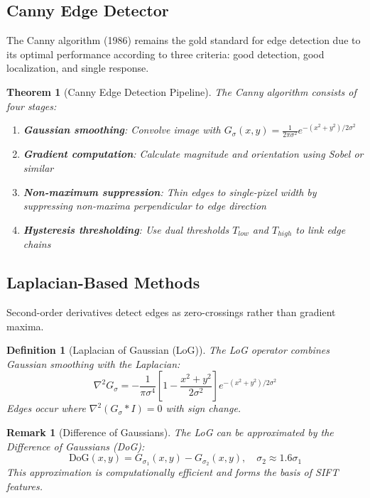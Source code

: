 \documentclass[a4paper, 11pt]{article}
\newtheorem{definition}{Definition}[section]
\newtheorem{theorem}{Theorem}[section]
\newtheorem{remark}{Remark}[section]
\begin{document}
\subsection{Canny Edge Detector}

The Canny algorithm (1986) remains the gold standard for edge detection due to its optimal
performance according to three criteria: good detection, good localization, and single response.

\begin{theorem}[Canny Edge Detection Pipeline]
The Canny algorithm consists of four stages:
\begin{enumerate}
\item \textbf{Gaussian smoothing}: Convolve image with $G_\sigma(x,y) = \frac{1}{2\pi\sigma^2}e^{-(x^2+y^2)/2\sigma^2}$
\item \textbf{Gradient computation}: Calculate magnitude and orientation using Sobel or similar
\item \textbf{Non-maximum suppression}: Thin edges to single-pixel width by suppressing non-maxima perpendicular to edge direction
\item \textbf{Hysteresis thresholding}: Use dual thresholds $T_{low}$ and $T_{high}$ to link edge chains
\end{enumerate}
\end{theorem}

\subsection{Laplacian-Based Methods}

Second-order derivatives detect edges as zero-crossings rather than gradient maxima.

\begin{definition}[Laplacian of Gaussian (LoG)]
The LoG operator combines Gaussian smoothing with the Laplacian:
\begin{equation}
\nabla^2 G_\sigma = -\frac{1}{\pi\sigma^4}\left[1 - \frac{x^2+y^2}{2\sigma^2}\right]e^{-(x^2+y^2)/2\sigma^2}
\end{equation}
Edges occur where $\nabla^2(G_\sigma * I) = 0$ with sign change.
\end{definition}

\begin{remark}[Difference of Gaussians]
The LoG can be approximated by the Difference of Gaussians (DoG):
\begin{equation}
\text{DoG}(x,y) = G_{\sigma_1}(x,y) - G_{\sigma_2}(x,y), \quad \sigma_2 \approx 1.6\sigma_1
\end{equation}
This approximation is computationally efficient and forms the basis of SIFT features.
\end{remark}
\end{document}

